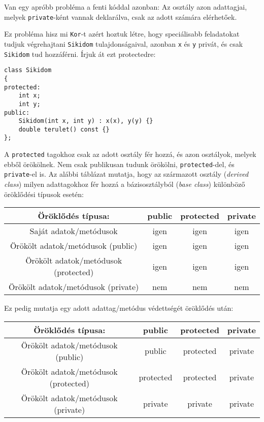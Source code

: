 \documentclass[a4paper,11.5pt,table]{article}
\begin{document}
	Van egy apróbb probléma a fenti kóddal azonban: Az osztály azon adattagjai, melyek \texttt{private}-ként vannak deklarálva, csak az adott számára elérhetőek.
	
	Ez probléma hisz mi \texttt{Kor}-t azért hoztuk létre, hogy speciálisabb feladatokat tudjuk végrehajtani \texttt{Sikidom} tulajdonságaival, azonban \texttt{x} és \texttt{y} privát, és csak \texttt{Sikidom} tud hozzáférni. Írjuk át ezt protectedre:
\begin{lstlisting}
class Sikidom
{
protected:
	int x;
	int y;
public:
	Sikidom(int x, int y) : x(x), y(y) {}
	double terulet() const {}
};
\end{lstlisting}
	A \texttt{protected} tagokhoz csak az adott osztály fér hozzá, és azon osztályok, melyek ebből örökölnek. Nem csak publikusan tudunk örökölni, \texttt{protected}-del, és \texttt{private}-el is. Az alábbi táblázat mutatja, hogy az származott osztály (\textit{derived class}) milyen adattagokhoz fér hozzá a bázisosztályból (\textit{base class}) különböző öröklődési típusok esetén:
	\begin{center}
		\setlength{\extrarowheight}{2pt}
		\begin{tabular}{|c||c|c|c|}
			\hline
			Öröklődés típusa:&public&protected&private\\
			\hline
			\hline
			Saját adatok/metódusok& \cellcolor{green!20}igen&\cellcolor{green!20}igen&\cellcolor{green!20}igen\\
			\hline
			Örökölt adatok/metódusok (public)&\cellcolor{green!20}igen&\cellcolor{green!20}igen&\cellcolor{green!20}igen\\
			\hline
			Örökölt adatok/metódusok (protected)&\cellcolor{green!20}igen&\cellcolor{green!20}igen&\cellcolor{green!20}igen\\
			\hline
			Örökölt adatok/metódusok (private)&\cellcolor{red!20}nem&\cellcolor{red!20}nem&\cellcolor{red!20}nem\\
			\hline
		\end{tabular}
	\end{center}
	Ez pedig mutatja egy adott adattag/metódus védettségét öröklődés után:
	\begin{center}
		\begin{tabular}{|c||c|c|c|}
			\hline
			Öröklődés típusa:&public&protected&private\\
			\hline
			\hline
			Örökölt adatok/metódusok (public)&\cellcolor{green!20}public&\cellcolor{orange!20}protected&\cellcolor{red!20}private\\
			\hline
			Örökölt adatok/metódusok (protected)&\cellcolor{orange!20}protected&\cellcolor{orange!20}protected&\cellcolor{red!20}private\\
			\hline
			Örökölt adatok/metódusok (private)&\cellcolor{red!20}private&\cellcolor{red!20}private&\cellcolor{red!20}private\\
			\hline
		\end{tabular}
	\end{center}
\end{document}
